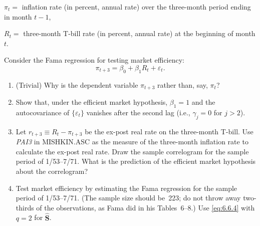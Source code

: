 \begin{problemset}
$\pi_t =$ inflation rate (in percent, annual rate) over the three-month
period ending in month $t - 1$,

$R_t =$ three-month T-bill rate (in percent, annual rate) at the beginning
of month $t$.

Consider the Fama regression for testing market efficiency:
\[
  \pi_{t+3} = \beta_0 + \beta_1 R_t + \varepsilon_t.
\]

\begin{enumerate}[label=(\alph*)]
\item (Trivial) \; Why is the dependent variable $\pi_{t+3}$ rather than, say, $\pi_t$?

\item Show that, under the efficient market hypothesis, $\beta_1 = 1$ and the autocovariance
of $\{\varepsilon_t\}$ vanishes after the second lag (i.e., $\gamma_j = 0$ for $j > 2$).

\item Let $r_{t+3} \equiv R_t - \pi_{t+3}$ be the ex-post real rate on the three-month T-bill.
Use \emph{PAI3} in MISHKIN.ASC as the measure of the three-month inflation
rate to calculate the ex-post real rate. Draw the sample correlogram for the sample period of 1/53--7/71. What is
the prediction of the efficient market hypothesis about the correlogram?

\item Test market efficiency by estimating the Fama regression for the sample
period of 1/53--7/71. (The sample size should be~223; do not throw away
two-thirds of the observations, as Fama did in his Tables~6--8.) Use \eqref{eq:6.6.4}
with $q = 2$ for $\hat{\mathbf{S}}$.
\end{enumerate}

\end{problemset}

